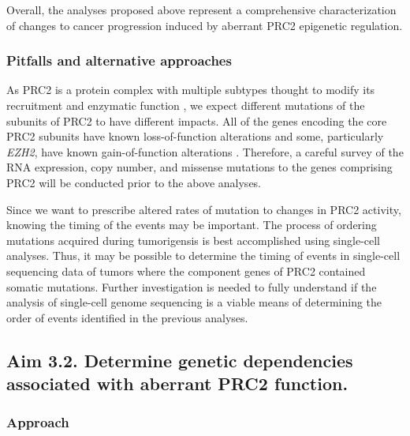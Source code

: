 Overall, the analyses proposed above represent a comprehensive characterization of changes to cancer progression induced by aberrant PRC2 epigenetic regulation.


\subsubsection*{Pitfalls and alternative approaches}

As PRC2 is a protein complex with multiple subtypes thought to modify its recruitment and enzymatic function \cite{Wassef2017, Holoch2017, Kasinath2018, Laugesen2019a}, we expect different mutations of the subunits of PRC2 to have different impacts.
All of the genes encoding the core PRC2 subunits have known loss-of-function alterations and some, particularly \emph{EZH2}, have known gain-of-function alterations \cite{Comet2016MaintainingCancer.}.
Therefore, a careful survey of the RNA expression, copy number, and missense mutations to the genes comprising PRC2 will be conducted prior to the above analyses.

Since we want to prescribe altered rates of mutation to changes in PRC2 activity, knowing the timing of the events may be important.
The process of ordering mutations acquired during tumorigensis is best accomplished using single-cell analyses.
Thus, it may be possible to determine the timing of events in single-cell sequencing data of tumors where the component genes of PRC2 contained somatic mutations.
Further investigation is needed to fully understand if the analysis of single-cell genome sequencing is a viable means of determining the order of events identified in the previous analyses.




\subsection*{Aim 3.2. Determine genetic dependencies associated with aberrant PRC2 function.}


\subsubsection*{Approach}

